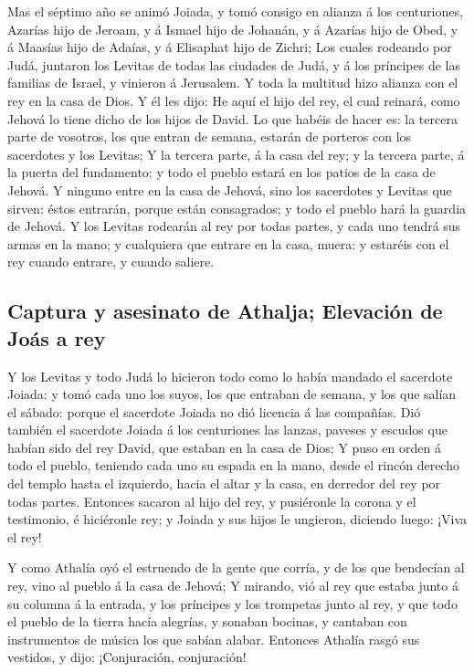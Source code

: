  Mas el séptimo año se animó Joiada, y tomó consigo en
alianza á los centuriones, Azarías hijo de Jeroam, y á Ismael hijo de
Johanán, y á Azarías hijo de Obed, y á Maasías hijo de Adaías, y á
Elisaphat hijo de Zichri;  Los cuales rodeando por Judá,
juntaron los Levitas de todas las ciudades de Judá, y á los príncipes de
las familias de Israel, y vinieron á Jerusalem.  Y toda la
multitud hizo alianza con el rey en la casa de Dios. Y él les dijo: He
aquí el hijo del rey, el cual reinará, como Jehová lo tiene dicho de los
hijos de David.  Lo que habéis de hacer es: la tercera parte
de vosotros, los que entran de semana, estarán de porteros con los
sacerdotes y los Levitas;  Y la tercera parte, á la casa del
rey; y la tercera parte, á la puerta del fundamento: y todo el pueblo
estará en los patios de la casa de Jehová.  Y ninguno entre
en la casa de Jehová, sino los sacerdotes y Levitas que sirven: éstos
entrarán, porque están consagrados; y todo el pueblo hará la guardia de
Jehová.  Y los Levitas rodearán al rey por todas partes, y
cada uno tendrá sus armas en la mano; y cualquiera que entrare en la
casa, muera: y estaréis con el rey cuando entrare, y cuando saliere.

\hypertarget{captura-y-asesinato-de-athalja-elevaciuxf3n-de-jouxe1s-a-rey}{%
\subsection{Captura y asesinato de Athalja; Elevación de Joás a
rey}\label{captura-y-asesinato-de-athalja-elevaciuxf3n-de-jouxe1s-a-rey}}

 Y los Levitas y todo Judá lo hicieron todo como lo había
mandado el sacerdote Joiada: y tomó cada uno los suyos, los que entraban
de semana, y los que salían el sábado: porque el sacerdote Joiada no dió
licencia á las compañías.  Dió también el sacerdote Joiada á
los centuriones las lanzas, paveses y escudos que habían sido del rey
David, que estaban en la casa de Dios;  Y puso en orden á
todo el pueblo, teniendo cada uno su espada en la mano, desde el rincón
derecho del templo hasta el izquierdo, hacia el altar y la casa, en
derredor del rey por todas partes.  Entonces sacaron al
hijo del rey, y pusiéronle la corona y el testimonio, é hiciéronle rey;
y Joiada y sus hijos le ungieron, diciendo luego: ¡Viva el rey!

 Y como Athalía oyó el estruendo de la gente que corría, y
de los que bendecían al rey, vino al pueblo á la casa de Jehová;
 Y mirando, vió al rey que estaba junto á su columna á la
entrada, y los príncipes y los trompetas junto al rey, y que todo el
pueblo de la tierra hacía alegrías, y sonaban bocinas, y cantaban con
instrumentos de música los que sabían alabar. Entonces Athalía rasgó sus
vestidos, y dijo: ¡Conjuración, conjuración!

